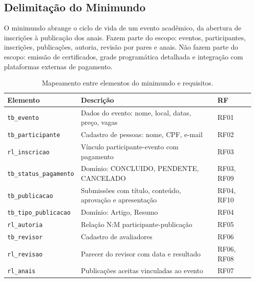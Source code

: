 \documentclass[12pt,a4paper]{article}
\begin{document}
\subsection{Delimitação do Minimundo}
\label{subsec:minimundo}

O minimundo abrange o ciclo de vida de um evento acadêmico, da abertura de inscrições à publicação dos anais. Fazem parte do escopo: eventos, participantes, inscrições, publicações, autoria, revisão por pares e anais. Não fazem parte do escopo: emissão de certificados, grade programática detalhada e integração com plataformas externas de pagamento.

\begin{table}[htb]
\centering
\caption{Mapeamento entre elementos do minimundo e requisitos.}
\label{tab:minimundo-requisitos}
\small
\begin{tabularx}{\textwidth}{|l|X|l|}
\hline
\textbf{Elemento} & \textbf{Descrição} & \textbf{RF} \\
\hline
\texttt{tb\_evento}            & Dados do evento: nome, local, datas, preço, vagas        & RF01 \\
\hline
\texttt{tb\_participante}      & Cadastro de pessoas: nome, CPF, e-mail                   & RF02 \\
\hline
\texttt{rl\_inscricao}         & Vínculo participante-evento com pagamento                & RF03 \\
\hline
\texttt{tb\_status\_pagamento} & Domínio: CONCLUIDO, PENDENTE, CANCELADO                  & RF03, RF09 \\
\hline
\texttt{tb\_publicacao}        & Submissões com título, conteúdo, aprovação e apresentação & RF04, RF10 \\
\hline
\texttt{tb\_tipo\_publicacao}  & Domínio: Artigo, Resumo                                  & RF04 \\
\hline
\texttt{rl\_autoria}           & Relação N:M participante-publicação                      & RF05 \\
\hline
\texttt{tb\_revisor}           & Cadastro de avaliadores                                  & RF06 \\
\hline
\texttt{rl\_revisao}           & Parecer do revisor com data e resultado                  & RF06, RF08 \\
\hline
\texttt{rl\_anais}             & Publicações aceitas vinculadas ao evento                 & RF07 \\
\hline
\end{tabularx}
\end{table}
\end{document}
